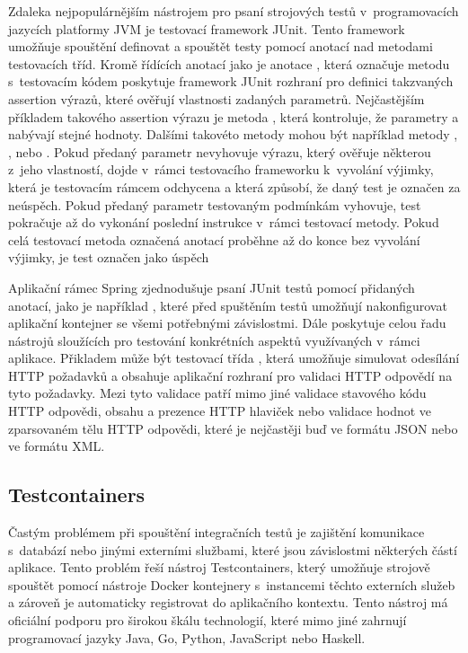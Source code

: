 Zdaleka nejpopulárnějším nástrojem pro psaní strojových testů v~programovacích jazycích platformy JVM je testovací framework JUnit. Tento framework umožňuje spouštění definovat a spouštět testy pomocí anotací nad metodami testovacích tříd. Kromě řídících anotací jako je anotace , která označuje metodu s~testovacím kódem poskytuje framework JUnit rozhraní pro definici takzvaných assertion výrazů, které ověřují vlastnosti zadaných parametrů. Nejčastějším příkladem takového assertion výrazu je metoda  , která kontroluje, že parametry  a  nabývají stejné hodnoty. Dalšími takovéto metody mohou být například metody , ,  nebo . Pokud předaný parametr nevyhovuje výrazu, který ověřuje některou z~jeho vlastností, dojde v~rámci testovacího frameworku k~vyvolání výjimky, která je testovacím rámcem odchycena a která způsobí, že daný test je označen za neúspěch. Pokud předaný parametr testovaným podmínkám vyhovuje, test pokračuje až do vykonání poslední instrukce v~rámci testovací metody. Pokud celá testovací metoda označená anotací  proběhne až do konce bez vyvolání výjimky, je test označen jako úspěch \cite{gulati_junit_2017}

Aplikační rámec Spring zjednodušuje psaní JUnit testů pomocí přidaných anotací, jako je například , které před spuštěním testů umožňují nakonfigurovat aplikační kontejner se všemi potřebnými závislostmi. Dále poskytuje celou řadu nástrojů sloužících pro testování konkrétních aspektů využívaných v~rámci aplikace. Přikladem může být testovací třída , která umožňuje simulovat odesílání HTTP požadavků a obsahuje aplikační rozhraní pro validaci HTTP odpovědí na tyto požadavky. Mezi tyto validace patří mimo jiné validace stavového kódu HTTP odpovědi, obsahu a prezence HTTP hlaviček nebo validace hodnot ve zparsovaném tělu HTTP odpovědi, které je nejčastěji buď ve formátu JSON nebo ve formátu XML.

\subsection{Testcontainers}

Častým problémem při spouštění integračních testů je zajištění komunikace s~databází nebo jinými externími službami, které jsou závislostmi některých částí aplikace. Tento problém řeší nástroj Testcontainers, který umožňuje strojově spouštět pomocí nástroje Docker kontejnery s~instancemi těchto externích služeb a zároveň je automaticky registrovat do aplikačního kontextu. Tento nástroj má oficiální podporu pro širokou škálu technologií, které mimo jiné zahrnují programovací jazyky Java, Go, Python, JavaScript nebo Haskell.

